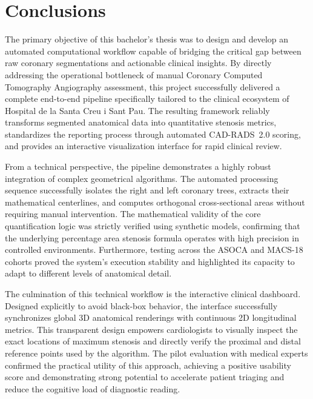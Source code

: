 \chapter{Conclusions}
\label{ch:conclusions}

\setlength{\parskip}{0.65em plus 0.15em minus 0.05em}
\setlength{\parindent}{0pt}

The primary objective of this bachelor's thesis was to design and develop an automated computational workflow capable of bridging the critical gap between raw coronary segmentations and actionable clinical insights. By directly addressing the operational bottleneck of manual Coronary Computed Tomography Angiography assessment, this project successfully delivered a complete end-to-end pipeline specifically tailored to the clinical ecosystem of Hospital de la Santa Creu i Sant Pau. The resulting framework reliably transforms segmented anatomical data into quantitative stenosis metrics, standardizes the reporting process through automated CAD-RADS~2.0 scoring, and provides an interactive visualization interface for rapid clinical review.

From a technical perspective, the pipeline demonstrates a highly robust integration of complex geometrical algorithms. The automated processing sequence successfully isolates the right and left coronary trees, extracts their mathematical centerlines, and computes orthogonal cross-sectional areas without requiring manual intervention. The mathematical validity of the core quantification logic was strictly verified using synthetic models, confirming that the underlying percentage area stenosis formula operates with high precision in controlled environments. Furthermore, testing across the ASOCA and MACS-18 cohorts proved the system's execution stability and highlighted its capacity to adapt to different levels of anatomical detail.

The culmination of this technical workflow is the interactive clinical dashboard. Designed explicitly to avoid black-box behavior, the interface successfully synchronizes global 3D anatomical renderings with continuous 2D longitudinal metrics. This transparent design empowers cardiologists to visually inspect the exact locations of maximum stenosis and directly verify the proximal and distal reference points used by the algorithm. The pilot evaluation with medical experts confirmed the practical utility of this approach, achieving a positive usability score and demonstrating strong potential to accelerate patient triaging and reduce the cognitive load of diagnostic reading.

